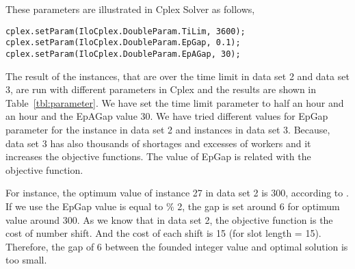 These parameters are illustrated in Cplex Solver as follows,

\begin{lstlisting}
cplex.setParam(IloCplex.DoubleParam.TiLim, 3600);
cplex.setParam(IloCplex.DoubleParam.EpGap, 0.1);
cplex.setParam(IloCplex.DoubleParam.EpAGap, 30);
\end{lstlisting}

The result of the instances, that are over the time limit in data set 2 and data set 3, are run with different parameters in Cplex and the results are shown in Table~\ref{tbl:parameter}. We have set the time limit parameter to half an hour and an hour and the EpAGap value 30. We have tried different values for EpGap parameter for the instance in data set 2 and instances in data set 3. Because, data set 3 has also thousands of shortages and excesses of workers and it increases the objective functions. The value of EpGap is related with the objective function. 

For instance, the optimum value of instance 27 in data set 2 is 300, according to \cite{li:2010:abseher}. If we use the EpGap value is equal to $\%$ 2, the gap is set around 6 for optimum value around 300. As we know that in data set 2, the objective function is the cost of number shift. And the cost of each shift is 15 (for slot length = 15). Therefore, the gap of 6 between the founded integer value and optimal solution is too small. 



